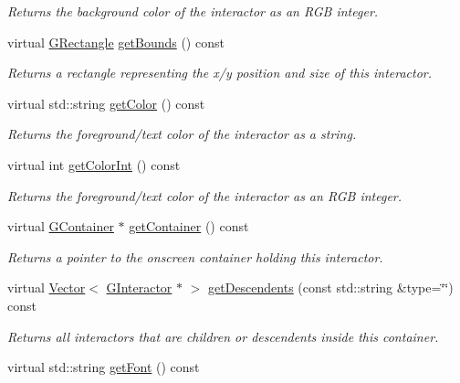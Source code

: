 \begin{DoxyCompactItemize}
\begin{DoxyCompactList}\small\item\em Returns the background color of the interactor as an R\+GB integer. \end{DoxyCompactList}\item 
virtual \mbox{\hyperlink{classGRectangle}{G\+Rectangle}} \mbox{\hyperlink{classGInteractor_a29e6ac35a0b48f491a4c88194cc5da3b}{get\+Bounds}} () const
\begin{DoxyCompactList}\small\item\em Returns a rectangle representing the x/y position and size of this interactor. \end{DoxyCompactList}\item 
virtual std\+::string \mbox{\hyperlink{classGInteractor_aa061dfa488c31e18549d64363c1d0e34}{get\+Color}} () const
\begin{DoxyCompactList}\small\item\em Returns the foreground/text color of the interactor as a string. \end{DoxyCompactList}\item 
virtual int \mbox{\hyperlink{classGInteractor_a9635c7af766cdc3417f346683fa0e6c1}{get\+Color\+Int}} () const
\begin{DoxyCompactList}\small\item\em Returns the foreground/text color of the interactor as an R\+GB integer. \end{DoxyCompactList}\item 
virtual \mbox{\hyperlink{classGContainer}{G\+Container}} $\ast$ \mbox{\hyperlink{classGInteractor_a7a6e317c29d61030929b4cd2d1c00fe7}{get\+Container}} () const
\begin{DoxyCompactList}\small\item\em Returns a pointer to the onscreen container holding this interactor. \end{DoxyCompactList}\item 
virtual \mbox{\hyperlink{classVector}{Vector}}$<$ \mbox{\hyperlink{classGInteractor}{G\+Interactor}} $\ast$ $>$ \mbox{\hyperlink{classGContainer_a5c520260dc9282097022249ea42c4a3f}{get\+Descendents}} (const std\+::string \&type=\char`\"{}\char`\"{}) const
\begin{DoxyCompactList}\small\item\em Returns all interactors that are children or descendents inside this container. \end{DoxyCompactList}\item 
virtual std\+::string \mbox{\hyperlink{classGInteractor_a894a5502900794eeb27d084c21f1d77d}{get\+Font}} () const

\end{DoxyCompactItemize}
